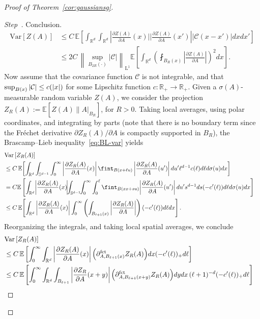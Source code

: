 \documentclass[AHL,Unicode,longabstracts]{cedram}
\newcommand{\R}{\mathbb R}
\newcommand{\Sp}{\mathbb S}
\newcommand{\E}{\mathbb{E}}
\newcommand{\Cc}{\mathcal C}
\DeclareMathOperator{\Ld}{L}
\newcommand{\parfct}[1]{\partial_{#1}^{\operatorname{fct}}}
\newcommand{\var}[1]{\mathrm{Var}\left[#1\right]}
\newcounter{stepcount}
\newenvironment{step}{\refstepcounter{stepcount}\begin{proof}[Step~\thestepcount]}{\let\qed\relax\end{proof}}
\begin{document}
\begin{proof}[Proof of Theorem~\ref{cor:gaussiansg}]
\begin{step}{Conclusion.}
\begin{align*}
\var{Z(A)}&\le C\,\E\left[\int_{\R^d}\int_{\R^d} \left|\frac{\partial Z(A)}{\partial A}(x)\bigg|\bigg|\frac{\partial Z(A)}{\partial A}(x')\right||\Cc(x-x')|dxdx'\right]
\\
&\le2C\,\left\|\sup_{B_{2R}(\cdot)}|\Cc|\right\|_{\Ld^1}\E\left[\int_{\R^d} \left(\fint_{B_R(x)}\left|\frac{\partial Z(A)}{\partial A}\right|\right)^2dx\right].
\end{align*}
Now assume that the covariance function $\Cc$ is not integrable, and that $\sup_{B(x)}\linebreak|\Cc|\le c(|x|)$ for some Lipschitz function $c:\R_+\to\R_+$. Given a $\sigma(A)$-measurable random variable $Z(A)$, we consider the projection $Z_R(A):=\E[Z(A)\| A|_{B_R}]$, for $R>0$. Taking local averages, using polar coordinates, and integrating by parts (note that there is no boundary term since the Fréchet derivative $\partial Z_R(A)/\partial A$ is compactly supported in $B_R$), the Brascamp--Lieb inequality~\eqref{eq:BL-var} yields
{\small
\begin{align*}
\lefteqn{\var{Z_R(A)}}
\\
&\le C\,\E\!\left[\int_{\R^d}\int_{\Sp^{d-1}}\int_0^\infty
\left|\frac{\partial Z_R(A)}{\partial A}(x) \right|\fint_{B(x+\ell u)}\left|\frac{\partial Z_R(A)}{\partial A}(u')\right|du' \ell^{d-1}c(\ell)d\ell d\sigma(u)dx\right]\\
&=C\E\left[\int_{\R^d}\!\left|\frac{\partial Z_R(A)}{\partial A}(x)\!\right|\!\!\int_{\Sp^{d-1}}\!\!\int_0^\infty\int_0^\ell
\fint_{B(xx+s u)}\!\left|\frac{\partial Z_R(A)}{\partial A}(u')\right|du' s^{d-1}ds(-c'(\ell))d\ell d\sigma(u)dx\right]\\
&\le C\,\E\!\left[\int_{\R^d} \left|\frac{\partial Z_R(A)}{\partial A}(x) \right|\int_0^\infty\left(\int_{B_{\ell+1}(x)}\left|\frac{\partial Z_R(A)}{\partial A}\right|\right)(-c'(\ell))d\ell dx\right].
\end{align*}
}
Reorganizing the integrals, and taking local spatial averages, we conclude
\begin{align*}
\lefteqn{\var{Z_R(A)}}
\\
&\le C\,\E\left[\int_0^\infty \int_{\R^d} \left|\frac{\partial Z_R(A)}{\partial A}(x) \right|\Big(\parfct{A,B_{\ell+1}(x)}Z_R(A)\Big) dx(-c'(\ell))_+d\ell\right]\\
&\le C\,\E\left[\int_0^\infty \int_{\R^d}\int_{B_{\ell+1}}\left|\frac{\partial Z_R}{\partial A}(x+y)\right|\Big(\parfct{A,B_{\ell+1}(x+y)}Z_R(A)\Big)dydx\,(\ell+1)^{-d}(-c'(\ell))_+d\ell\right]\\

\end{align*}
\end{step}
\end{proof}
\end{document}
